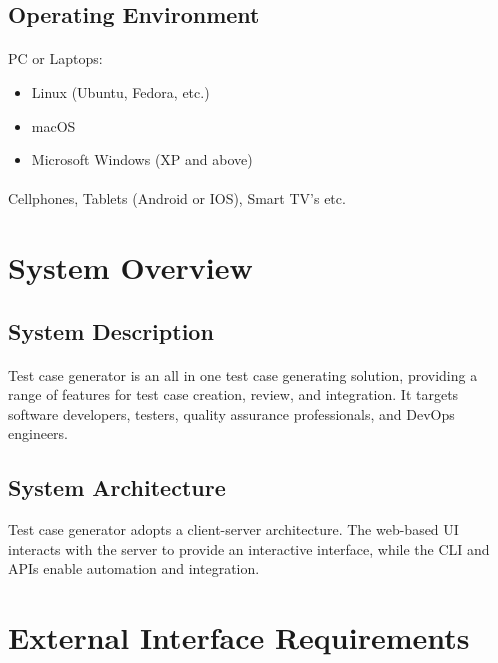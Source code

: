 \documentclass{article}
\begin{document}
\subsection{Operating Environment}
\paragraph{}
PC or Laptops:
\begin{itemize}
    \item Linux (Ubuntu, Fedora, etc.)
    \item macOS
    \item Microsoft Windows (XP and above)
\end{itemize}
\paragraph{}
Cellphones, Tablets (Android or IOS), Smart TV's etc.


\section{System Overview}
\subsection{System Description}
\paragraph{}
Test case generator is an all in one test case generating solution, providing a range
of features for test case creation, review, and integration. It targets software
developers, testers, quality assurance professionals, and DevOps engineers.

\subsection{System Architecture}
Test case generator adopts a client-server architecture. The web-based UI interacts with
the server to provide an interactive interface, while the CLI and APIs enable automation
and integration.


\section{External Interface Requirements}
\end{document}
